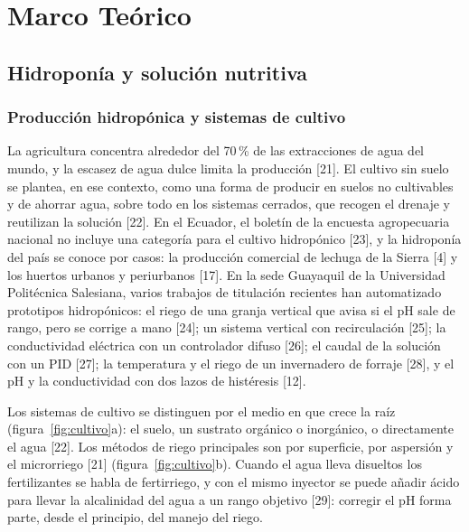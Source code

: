 \section{Marco Teórico}\label{sec:mt}

\subsection{Hidroponía y solución nutritiva}\label{sec:hidroponia}

\subsubsection{Producción hidropónica y sistemas de cultivo}\label{sec:sistemas}
La agricultura concentra alrededor del 70\,\% de las extracciones de agua del mundo, y la escasez de agua dulce limita la producción [21]. El cultivo sin suelo se plantea, en ese contexto, como una forma de producir en suelos no cultivables y de ahorrar agua, sobre todo en los sistemas cerrados, que recogen el drenaje y reutilizan la solución [22]. En el Ecuador, el boletín de la encuesta agropecuaria nacional no incluye una categoría para el cultivo hidropónico [23], y la hidroponía del país se conoce por casos: la producción comercial de lechuga de la Sierra [4] y los huertos urbanos y periurbanos [17]. En la sede Guayaquil de la Universidad Politécnica Salesiana, varios trabajos de titulación recientes han automatizado prototipos hidropónicos: el riego de una granja vertical que avisa si el pH sale de rango, pero se corrige a mano [24]; un sistema vertical con recirculación [25]; la conductividad eléctrica con un controlador difuso [26]; el caudal de la solución con un PID [27]; la temperatura y el riego de un invernadero de forraje [28], y el pH y la conductividad con dos lazos de histéresis [12].

Los sistemas de cultivo se distinguen por el medio en que crece la raíz (figura~\ref{fig:cultivo}a): el suelo, un sustrato orgánico o inorgánico, o directamente el agua [22]. Los métodos de riego principales son por superficie, por aspersión y el microrriego [21] (figura~\ref{fig:cultivo}b). Cuando el agua lleva disueltos los fertilizantes se habla de fertirriego, y con el mismo inyector se puede añadir ácido para llevar la alcalinidad del agua a un rango objetivo [29]: corregir el pH forma parte, desde el principio, del manejo del riego.


